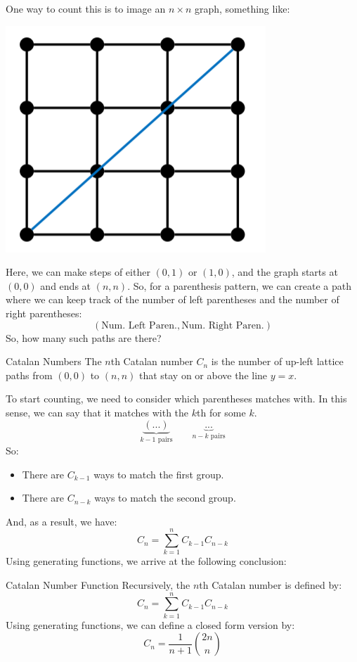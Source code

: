 \documentclass[letterpaper]{article}
\begin{document}
\bigskip 

One way to count this is to image an $n \times n$ graph, something like:
\begin{center}
    \includegraphics[scale=0.6]{img/graph_cat.PNG}
\end{center}
Here, we can make steps of either $(0, 1)$ or $(1, 0)$, and the graph starts at $(0, 0)$ and ends at $(n, n)$. So, for a parenthesis pattern, we can create a path where we can keep track of the number of left parentheses and the number of right parentheses:
\[(\text{Num. Left Paren.}, \text{Num. Right Paren.})\]
So, how many such paths are there? 
\begin{definition}{Catalan Numbers}{}
    The $n$th Catalan number $C_n$ is the number of up-left lattice paths from $(0, 0)$ to $(n, n)$ that stay on or above the line $y = x$.
\end{definition}
To start counting, we need to consider which parentheses \code{(} matches with. In this sense, we can say that it matches with the $k$th \code{)} for some $k$. 
\[\underbrace{(...)}_{k - 1 \text{ pairs}} \qquad \underbrace{...}_{n - k \text{ pairs}}\]
So:
\begin{itemize}
    \item There are $C_{k - 1}$ ways to match the first group.
    \item There are $C_{n - k}$ ways to match the second group. 
\end{itemize}
And, as a result, we have:
\[C_n = \sum_{k = 1}^{n} C_{k - 1} C_{n - k}\]
Using generating functions, we arrive at the following conclusion:
\begin{definition}{Catalan Number Function}{}
    Recursively, the $n$th Catalan number is defined by:
    \[C_n = \sum_{k = 1}^n C_{k - 1}C_{n - k}\]
    Using generating functions, we can define a closed form version by:
    \[C_n = \frac{1}{n + 1} \binom{2n}{n}\]
\end{definition}
\end{document}
